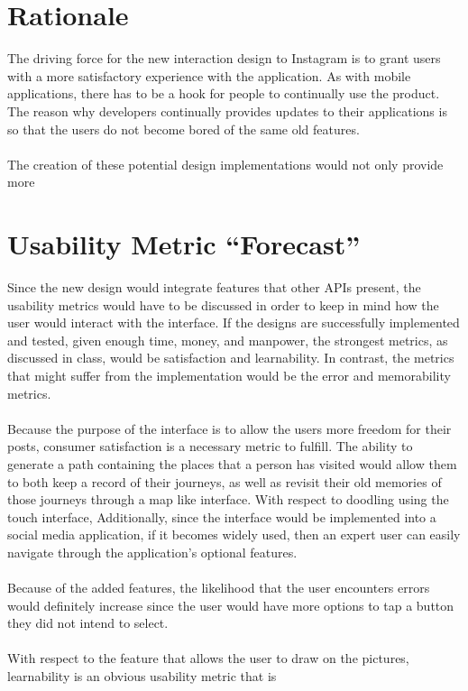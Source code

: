 \documentclass[11pt]{article}
\begin{document}
\pagebreak

\section{Rationale}
   \indent
   \indent The driving force for the new interaction design to Instagram is to grant users with a more satisfactory experience with the application. As with mobile applications, there has to be a hook for people to continually use the product. The reason why developers continually provides updates to their applications is so that the users do not become bored of the same old features. \\ \\
   \indent The creation of these potential design implementations would not only provide more

\section{Usability Metric ``Forecast''}
   \indent 
   \indent Since the new design would integrate features that other APIs present, the usability metrics would have to be discussed in order to keep in mind how the user would interact with the interface. If the designs are successfully implemented and tested, given enough time, money, and manpower, the strongest metrics, as discussed in class, would be satisfaction and learnability. In contrast, the metrics that might suffer from the implementation would be the error and memorability metrics.\\ \\
   \indent Because the purpose of the interface is to allow the users more freedom for their posts, consumer satisfaction is a necessary metric to fulfill. The ability to generate a path containing the places that a person has visited would allow them to both keep a record of their journeys, as well as revisit their old memories of those journeys through a map like interface. With respect to doodling using the touch interface, Additionally, since the interface would be implemented into a social media application, if it becomes widely used, then an expert user can easily navigate through the application's optional features.\\ \\
   \indent Because of the added features, the likelihood that the user encounters errors would definitely increase since the user would have more options to tap a button they did not intend to select. \\ \\
   \indent With respect to the feature that allows the user to draw on the pictures, learnability is an obvious usability metric that is \\

\clearpage


\end{document}
